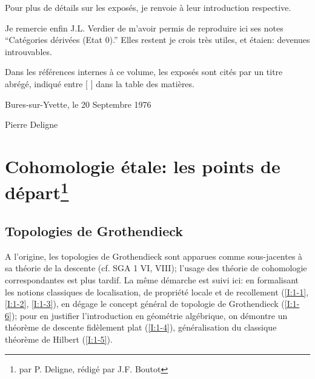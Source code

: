 \documentclass[oneside]{book}
\begin{document}
Pour plus de détails sur les exposés, je renvoie à leur introduction 
respective. 

Je remercie enfin J.L. Verdier de m'avoir permis de reproduire ici ses notes 
``Catégories dérivées (Etat $0$).'' Elles restent je crois très utiles, et 
étaien: devenues introuvables. 

Dans les références internes à ce volume, les exposés sont cités par 
un titre abrégé, indiqué entre [ ] dans la table des matières. 

\vspace{20pt}
Bures-sur-Yvette, le 20 Septembre 1976

\vspace{5pt}
Pierre Deligne










\tableofcontents




















\chapter{Cohomologie étale: les points de départ\texorpdfstring{\footnote{par P. Deligne, rédigé par J.F. Boutot}}{}}




















\section{Topologies de Grothendieck}\label{I:1}

A l'origine, les topologies de Grothendieck sont apparues comme sous-jacentes 
à sa théorie de la descente (cf. SGA 1 VI, VIII); l'usage des théorie de 
cohomologie correspondantes est plus tardif. La même démarche est suivi 
ici: en formalisant les notions classiques de localisation, de propriété 
locale et de recollement (\ref{I:1-1}, \ref{I:1-2}, \ref{I:1-3}), en dégage le 
concept général de topologie de Grothendieck (\ref{I:1-6}); pour en justifier 
l'introduction en géométrie algébrique, on démontre un théorème 
de descente fidèlement plat (\ref{I:1-4}), généralisation du classique théorème 
de Hilbert (\ref{I:1-5}). 
\end{document}
